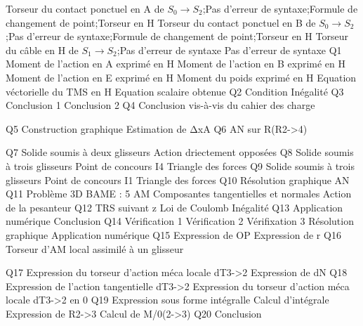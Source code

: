 Torseur du contact ponctuel en A de $S_0\to S_2$;Pas d'erreur de syntaxe;Formule de changement de point;Torseur en H
Torseur du contact ponctuel en B de $S_0\to S_2$;Pas d'erreur de syntaxe;Formule de changement de point;Torseur en H
Torseur du câble en H de $S_1\to S_2$;Pas d'erreur de syntaxe
Pas d'erreur de syntaxe
Q1
Moment de l'action en A exprimé en H
Moment de l'action en B exprimé en H
Moment de l'action en E exprimé en H
Moment du poids exprimé en H
Equation véctorielle du TMS en H
Equation scalaire obtenue
Q2
Condition
Inégalité
Q3
Conclusion 1
Conclusion 2
Q4
Conclusion vis-à-vis du cahier des charge

Q5
Construction graphique
Estimation de ΔxA
Q6
AN sur R(R2->4)

Q7
Solide soumis à deux glisseurs
Action driectement opposées
Q8
Solide soumis à trois glisseurs
Point de concours I4
Triangle des forces
Q9
Solide soumis à trois glisseurs
Point de concours I1
Triangle des forces
Q10
Résolution graphique
AN
Q11
Problème 3D
BAME : 5 AM
Composantes tangentielles et normales
Action de la pesanteur
Q12
TRS suivant z
Loi de Coulomb
Inégalité
Q13
Application numérique
Conclusion
Q14
Vérification 1
Vérification 2
Vérifixation 3
Résolution graphique
Application numérique
Q15
Expression de OP
Expression de r
Q16
Torseur d'AM local assimilé à un glisseur

Q17
Expression du torseur d'action méca locale dT3->2
Expression de dN
Q18
Expression de l'action tangentielle dT3->2
Expression du torseur d'action méca locale dT3->2 en 0
Q19
Expression sous forme intégralle
Calcul d'intégrale
Expression de R2->3
Calcul de M/0(2->3)
Q20
Conclusion
